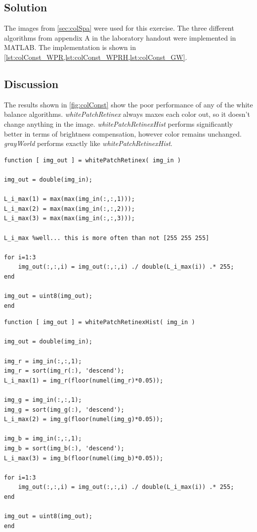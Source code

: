 \documentclass[
a4paper,     %
11pt         %
]{scrartcl}  %
\begin{document}
\subsection{Solution}
The images from \cref{sec:colSpa} were used for this exercise. The three different algorithms from appendix A in the laboratory handout\cite{HO} were implemented in MATLAB. The implementation is shown in \cref{lst:colConst_WPR,lst:colConst_WPRH,lst:colConst_GW}.


\subsection{Discussion}
The results shown in \cref{fig:colConst} show the poor performance of any of the white balance algorithms. \textit{whitePatchRetinex} always maxes each color out, so it doesn't change anything in the image.
\textit{whitePatchRetinexHist} performs significantly better in terms of brightness compensation, however color remains unchanged. \textit{grayWorld} performs exactly like \textit{whitePatchRetinexHist}.\\[2em]

\begin{lstlisting}[label=lst:colConst_WPR, caption=MATLAB implementation of whitePatchRetinex]
function [ img_out ] = whitePatchRetinex( img_in )

img_out = double(img_in);

L_i_max(1) = max(max(img_in(:,:,1)));
L_i_max(2) = max(max(img_in(:,:,2)));
L_i_max(3) = max(max(img_in(:,:,3)));

L_i_max %well... this is more often than not [255 255 255]

for i=1:3
    img_out(:,:,i) = img_out(:,:,i) ./ double(L_i_max(i)) .* 255;
end

img_out = uint8(img_out);
end
\end{lstlisting}
\newpage


\begin{lstlisting}[label=lst:colConst_WPRH, caption=MATLAB implementation of whitePatchRetinexHist]
function [ img_out ] = whitePatchRetinexHist( img_in )

img_out = double(img_in);

img_r = img_in(:,:,1);
img_r = sort(img_r(:), 'descend');
L_i_max(1) = img_r(floor(numel(img_r)*0.05));

img_g = img_in(:,:,1);
img_g = sort(img_g(:), 'descend');
L_i_max(2) = img_g(floor(numel(img_g)*0.05));

img_b = img_in(:,:,1);
img_b = sort(img_b(:), 'descend');
L_i_max(3) = img_b(floor(numel(img_b)*0.05));

for i=1:3
    img_out(:,:,i) = img_out(:,:,i) ./ double(L_i_max(i)) .* 255;
end

img_out = uint8(img_out);
end
\end{lstlisting}
\end{document}

